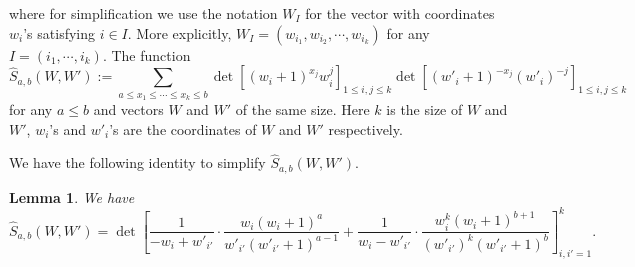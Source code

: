 \documentclass{article}
\newtheorem{lm}[thm]{Lemma}
\numberwithin{equation}{section}
\begin{document}
where for simplification we use the notation $W_I$ for the vector with coordinates $w_i$'s satisfying $i\in I$. More explicitly, $W_I=(w_{i_1},w_{i_2},\cdots,w_{i_k})$ for any $I=(i_1,\cdots,i_k)$. The function
\begin{equation*}
	\hat S_{a,b} \left(W,W'\right)
	  := \sum_{a\le x_1\le\cdots\le x_k\le b} 
	        \det\left[ (w_i+1)^{x_j} w_i^j\right]_{1\le i,j\le k}
	        \det\left[ (w'_i+1)^{-x_j} (w'_i)^{-j}\right]_{1\le i,j\le k}
\end{equation*}
for any $a\le b$ and vectors $W$ and $W'$ of the same size. Here $k$ is the size of $W$ and $W'$, $w_i$'s and $w'_i$'s are the coordinates of $W$ and $W'$ respectively.

We have the following identity to simplify $\hat S_{a,b} \left(W,W'\right)$.
\begin{lm}\cite{Baik-Liu17}
	\label{lem:double_sum}
	We have
	\begin{equation}
		\label{eq:S_ab}
		\hat S_{a,b}(W,W')
		=\det\left[
		          \frac{1}{-w_i+w'_{i'}}
		          \cdot
		          \frac{w_i (w_i+1)^a} {w'_{i'} (w'_{i'}+1)^{a-1}}
		          +
		          \frac{1}{w_i-w'_{i'}}
		          \cdot
		          \frac{w_i^k (w_i+1)^{b+1}} {(w'_{i'})^k (w'_{i'} +1)^b}
		     \right]_{i,i'=1}^k.
	\end{equation}
\end{lm}
\end{document}
